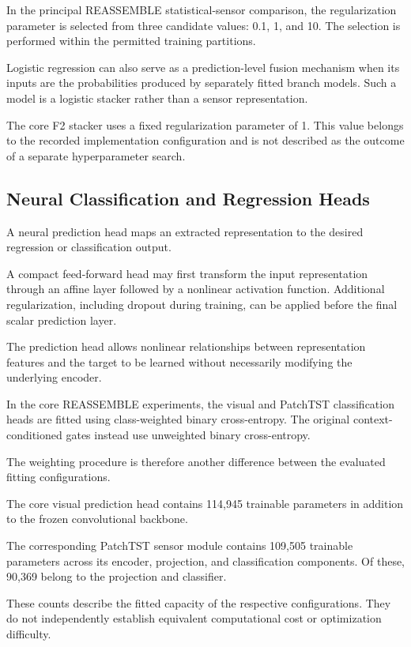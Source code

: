 In the principal REASSEMBLE statistical-sensor comparison, the regularization parameter is selected from three candidate values: 0.1, 1, and 10. The selection is performed within the permitted training partitions.

Logistic regression can also serve as a prediction-level fusion mechanism when its inputs are the probabilities produced by separately fitted branch models. Such a model is a logistic stacker rather than a sensor representation.

The core F2 stacker uses a fixed regularization parameter of 1. This value belongs to the recorded implementation configuration and is not described as the outcome of a separate hyperparameter search.

\subsection{Neural Classification and Regression Heads}

A neural prediction head maps an extracted representation to the desired regression or classification output.

A compact feed-forward head may first transform the input representation through an affine layer followed by a nonlinear activation function. Additional regularization, including dropout during training, can be applied before the final scalar prediction layer.

The prediction head allows nonlinear relationships between representation features and the target to be learned without necessarily modifying the underlying encoder.

In the core REASSEMBLE experiments, the visual and PatchTST classification heads are fitted using class-weighted binary cross-entropy. The original context-conditioned gates instead use unweighted binary cross-entropy.

The weighting procedure is therefore another difference between the evaluated fitting configurations.

The core visual prediction head contains 114,945 trainable parameters in addition to the frozen convolutional backbone.

The corresponding PatchTST sensor module contains 109,505 trainable parameters across its encoder, projection, and classification components. Of these, 90,369 belong to the projection and classifier.

These counts describe the fitted capacity of the respective configurations. They do not independently establish equivalent computational cost or optimization difficulty.

